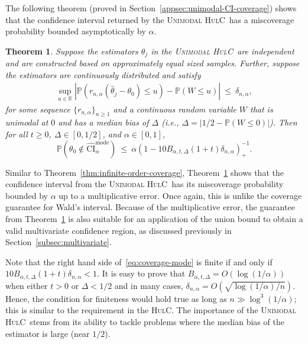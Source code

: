 \documentclass{article}
\newcommand{\hulcnospace}{\textsc{HulC}}
\newcommand{\uhulc}{\textsc{Unimodal HulC}~}
\newtheorem{thm}{Theorem}
\numberwithin{myalgctr}{section}
\begin{document}
The following theorem (proved in Section~\ref{appsec:unimodal-CI-coverage}) shows that the confidence interval returned by the \uhulc has a miscoverage probability bounded asymptotically by $\alpha$. 
\begin{thm}\label{thm:unimodal-CI-coverage}
Suppose the estimators $\widehat{\theta}_j$ in the \uhulc are independent and are constructed based on approximately equal sized samples. Further, suppose the estimators are continuously distributed and satisfy
\begin{align}
\label{eqn:near-unimodal}
\sup_{u\in\mathbb{R}}|\mathbb{P}(r_{n,\alpha}(\widehat{\theta}_j - \theta_0) \le u) - \mathbb{P}(W \le u)| ~\le~ \delta_{n,\alpha},
\end{align}
for some sequence $\{r_{n,\alpha}\}_{n\ge1}$ and a continuous random variable $W$ that is unimodal at $0$ and has a median bias of $\Delta$ (i.e., $\Delta = |1/2 - \mathbb{P}(W \le 0)|$). Then for all $t \ge 0$, $\Delta\in[0, 1/2]$, and $\alpha\in[0, 1]$,
\begin{equation}\label{eq:coverage-mode}
\mathbb{P}\left(\theta_0 \notin \widehat{\mathrm{CI}}_{\alpha}^{\mathrm{mode}}\right) ~\le~ \alpha\left(1 - 10B_{\alpha,t,\Delta}(1 + t)\delta_{n,\alpha}\right)_+^{-1}.
\end{equation}
\end{thm}
Similar to Theorem~\ref{thm:infinite-order-coverage}, Theorem~\ref{thm:unimodal-CI-coverage} shows that the confidence interval from the \uhulc {\color{black}has its miscoverage probability bounded by $\alpha$}
up to a multiplicative error. Once again, this is unlike the coverage guarantee for Wald's interval. 
Because of the multiplicative error, the guarantee from Theorem~\ref{thm:unimodal-CI-coverage} is also suitable for an application of the union bound to obtain a valid multivariate confidence region, as discussed previously in Section~\ref{subsec:multivariate}.

Note that the right hand side of~\eqref{eq:coverage-mode} is finite if and only if $10B_{\alpha,t,\Delta}(1 + t)\delta_{n,\alpha} < 1$. It is easy to prove that $B_{\alpha,t,\Delta} = O(\log(1/\alpha))$ when either $t > 0$ or $\Delta < 1/2$ and in many cases, $\delta_{n,\alpha} = O(\sqrt{\log(1/\alpha)/n})$. Hence, the condition for finiteness would hold true as long as $n \gg \log^3(1/\alpha)$; this is similar to the requirement in the \hulcnospace. The importance of the \uhulc stems from its ability to tackle problems where the median bias of the estimator is large (near $1/2$). 
\end{document}
